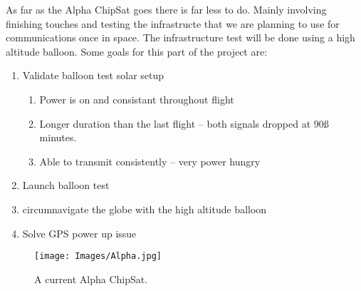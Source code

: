 As far as the Alpha ChipSat goes there is far less to do. Mainly involving finishing touches and testing the infrastructe that we are planning to use for communications once in space. The infrastructure test will be done using a high altitude balloon. Some goals for this part of the project are:
\begin{enumerate}
    \item Validate balloon test solar setup \begin{enumerate}
        \item Power is on and consistant throughout flight
        \item Longer duration than the last flight -- both signals dropped at 90ß minutes.
        \item Able to transmit consistently -- very power hungry
    \end{enumerate}
    \item Launch balloon test
    \item circumnavigate the globe with the high altitude balloon
    \item Solve GPS power up issue
\end{enumerate}
\begin{figure}[H]
    \begin{center}
            \texttt{[image: Images/Alpha.jpg]}\caption{A current Alpha ChipSat.}
    \end{center}
\end{figure}